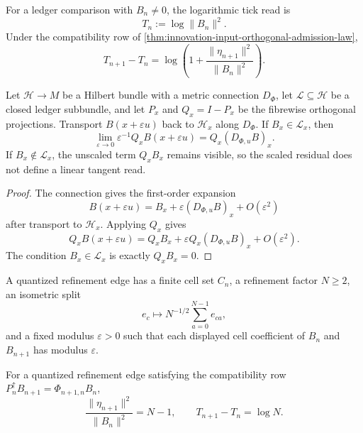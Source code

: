 \begin{definition}
\label{def:innovation-input-logarithmic-tick-read}
For a ledger comparison with $B_n\ne0$, the logarithmic tick read is
$$
T_n:=\log\|B_n\|^2.
$$
Under the compatibility row of
\autoref{thm:innovation-input-orthogonal-admission-law},
$$
T_{n+1}-T_n
=
\log\left(1+\frac{\|\eta_{n+1}\|^2}{\|B_n\|^2}\right).
$$
\end{definition}

\begin{theorem}
\label{thm:innovation-input-continuous-first-order-residual}
Let $\mathcal H\to M$ be a Hilbert bundle with a metric connection
$D_\Phi$, let $\mathcal L\subseteq\mathcal H$ be a closed ledger
subbundle, and let $P_x$ and $Q_x=I-P_x$ be the fibrewise orthogonal
projections. Transport $B(x+\varepsilon u)$ back to $\mathcal H_x$ along
$D_\Phi$. If $B_x\in\mathcal L_x$, then
$$
\lim_{\varepsilon\to0}
\varepsilon^{-1}Q_xB(x+\varepsilon u)
=
Q_x(D_{\Phi,u}B)_x.
$$
If $B_x\notin\mathcal L_x$, the unscaled term $Q_xB_x$ remains visible,
so the scaled residual does not define a linear tangent read.
\end{theorem}

\begin{proof}
The connection gives the first-order expansion
$$
B(x+\varepsilon u)
=
B_x+\varepsilon(D_{\Phi,u}B)_x+O(\varepsilon^2)
$$
after transport to $\mathcal H_x$. Applying $Q_x$ gives
$$
Q_xB(x+\varepsilon u)
=
Q_xB_x+\varepsilon Q_x(D_{\Phi,u}B)_x+O(\varepsilon^2).
$$
The condition $B_x\in\mathcal L_x$ is exactly $Q_xB_x=0$.
\end{proof}

\begin{definition}
\label{def:innovation-input-quantized-refinement-edge}
A quantized refinement edge has a finite cell set $C_n$, a refinement
factor $N\ge2$, an isometric split
$$
e_c\longmapsto N^{-1/2}\sum_{a=0}^{N-1}e_{ca},
$$
and a fixed modulus $\varepsilon>0$ such that each displayed cell
coefficient of $B_n$ and $B_{n+1}$ has modulus $\varepsilon$.
\end{definition}

\begin{theorem}
\label{thm:innovation-input-refinement-residual-rate}
For a quantized refinement edge satisfying the compatibility row
$P_n^\uparrow B_{n+1}=\Phi_{n+1,n}B_n$,
$$
\frac{\|\eta_{n+1}\|^2}{\|B_n\|^2}=N-1,
\qquad
T_{n+1}-T_n=\log N.
$$
\end{theorem}


